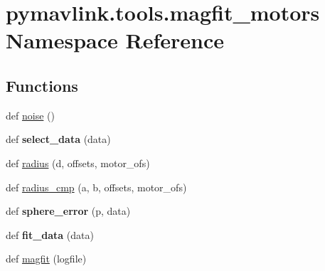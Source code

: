\hypertarget{namespacepymavlink_1_1tools_1_1magfit__motors}{}\section{pymavlink.\+tools.\+magfit\+\_\+motors Namespace Reference}
\label{namespacepymavlink_1_1tools_1_1magfit__motors}
\subsection*{Functions}
\begin{DoxyCompactItemize}
\item 
def \hyperlink{namespacepymavlink_1_1tools_1_1magfit__motors_a976924d27c33f71974f3d7c70674cf82}{noise} ()
\item 
\mbox{\label{namespacepymavlink_1_1tools_1_1magfit__motors_a6cf3772c22bd040df003057b8e5ae68d}} 
def {\bfseries select\+\_\+data} (data)
\item 
def \hyperlink{namespacepymavlink_1_1tools_1_1magfit__motors_a7251ec199a4f359bc17d4a45827cfd58}{radius} (d, offsets, motor\+\_\+ofs)
\item 
def \hyperlink{namespacepymavlink_1_1tools_1_1magfit__motors_aa6e80f814cf0800c2263a28e37fc849f}{radius\+\_\+cmp} (a, b, offsets, motor\+\_\+ofs)
\item 
\mbox{\label{namespacepymavlink_1_1tools_1_1magfit__motors_a37869b2a7af3e558569774e7940444e2}} 
def {\bfseries sphere\+\_\+error} (p, data)
\item 
\mbox{\label{namespacepymavlink_1_1tools_1_1magfit__motors_a894c345a3e835d40e605b38f7cd62db7}} 
def {\bfseries fit\+\_\+data} (data)
\item 
def \hyperlink{namespacepymavlink_1_1tools_1_1magfit__motors_a77e8faeadc7b37710f2d336d744e6492}{magfit} (logfile)
\end{DoxyCompactItemize}
